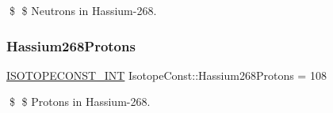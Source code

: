 \$ \$ Neutrons in Hassium-\/268. \mbox{\label{group___isotope_const-_hassium-_hs268_ga0972b9a84fa184b7d216f77e1bf3d2c7}} 
\subsubsection{\texorpdfstring{Hassium268\+Protons}{Hassium268Protons}}
{\footnotesize\ttfamily \mbox{\hyperlink{group___isotope_const-_macros_ga5f18360b3e99483a35c32d789e62621c}{I\+S\+O\+T\+O\+P\+E\+C\+O\+N\+S\+T\+\_\+\+I\+NT}} Isotope\+Const\+::\+Hassium268\+Protons = 108}

\$ \$ Protons in Hassium-\/268. 